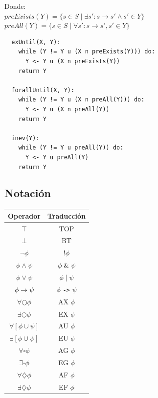 \documentclass[11pt]{article}
\begin{document}
Donde: \\

$preExists(Y) = \{s \in S \; | \; \exists s' : s \rightarrow s' \land s' \in Y\}$ \\
$preAll(Y) = \{s \in S \; | \; \forall s' : s \rightarrow s', s' \in Y\}$

\begin{verbatim}
  exUntil(X, Y):
    while (Y != Y u (X n preExists(Y))) do:
      Y <- Y u (X n preExists(Y))
    return Y
    
  forallUntil(X, Y):
    while (Y != Y u (X n preAll(Y))) do:
      Y <- Y u (X n preAll(Y))
    return Y

  inev(Y):
    while (Y != Y u preAll(Y)) do:
      Y <- Y u preAll(Y)
    return Y
\end{verbatim}

\subsection{Notación}

\begin{center}
  \begin{tabular}{ | c | c |}
   \hline
   \textbf{Operador} & \textbf{Traducción}  \\
   \hline 
   $\top$ & TOP  \\  
   \hline
   $\bot$ & BT   \\
   \hline
   $\neg \phi$ & !$\phi$   \\
   \hline
   $\phi \land \psi$ & $\phi \;  \&  \; \psi$   \\
   \hline
   $\phi \lor \psi$ & $\phi \; | \;  \psi$   \\
   \hline
   $\phi \rightarrow \psi$ & $\phi$ \texttt{->} $\psi$   \\
   \hline
   $\forall \bigcirc \phi$ & AX  $\phi$ \\
   \hline
   $\exists \bigcirc \phi$ & EX  $\phi$ \\
   \hline
   $\forall [\phi \cup \psi]$ & AU $\phi$  \\
   \hline
   $\exists [\phi \cup \psi]$ & EU $\phi$  \\
   \hline
   $\forall \square \phi$ & AG   $\phi$\\
   \hline
   $\exists \square \phi$ & EG   $\phi$\\
   \hline
   $\forall \diamondsuit \phi$ & AF $\phi$  \\
   \hline
   $\exists \diamondsuit \phi$ & EF $\phi$   \\
   \hline
  \end{tabular}
  \end{center}
\end{document}
